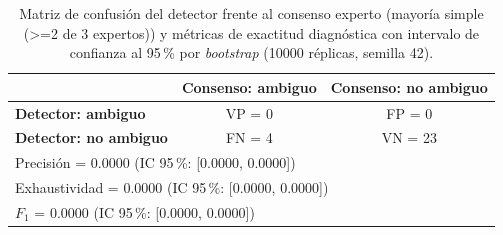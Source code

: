 \begin{table}[t]
\centering
\caption{Matriz de confusión del detector frente al consenso experto
(mayoría simple (>=2 de 3 expertos)) y métricas de exactitud diagnóstica con
intervalo de confianza al 95\,\% por \textit{bootstrap}
(10000 réplicas, semilla 42).}
\label{tab:confusion}
\begin{tabular}{lcc}
\hline
 & \textbf{Consenso: ambiguo} & \textbf{Consenso: no ambiguo} \\
\hline
\textbf{Detector: ambiguo}    & VP = 0 & FP = 0 \\
\textbf{Detector: no ambiguo} & FN = 4 & VN = 23 \\
\hline
\multicolumn{3}{l}{Precisión = 0.0000
 (IC 95\,\%: [0.0000, 0.0000])} \\
\multicolumn{3}{l}{Exhaustividad = 0.0000
 (IC 95\,\%: [0.0000, 0.0000])} \\
\multicolumn{3}{l}{$F_1$ = 0.0000
 (IC 95\,\%: [0.0000, 0.0000])} \\
\hline
\end{tabular}
\end{table}
